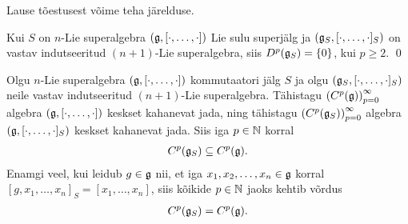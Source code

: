 Lause tõestusest võime teha järelduse.

\begin{jar}
    Kui $S$ on $n$-Lie superalgebra $(\mathfrak{g}, [\cdot, \dots, \cdot])$
    Lie sulu superjälg ja $(\mathfrak{g}_S, [\cdot, \dots, \cdot]_S)$ on
    vastav indutseeritud $(n+1)$-Lie superalgebra, siis
    $D^p(\mathfrak{g}_S) = \{0\}$, kui $p \geq 2$. \hfill \qed
\end{jar}

\begin{lau}
    Olgu $n$-Lie superalgebra $(\mathfrak{g}, [\cdot, \dots, \cdot])$
    kommutaatori jälg $S$ ja olgu $(\mathfrak{g}_S, [\cdot, \dots, \cdot]_S)$
    neile vastav indutseeritud $(n+1)$-Lie superalgebra.
    Tähistagu $\left(C^p(\mathfrak{g})\right)_{p=0}^\infty$ algebra
    $(\mathfrak{g}, [\cdot, \dots, \cdot])$
    keskset kahanevat jada, ning tähistagu
    $\left(C^p(\mathfrak{g}_S)\right)_{p=0}^\infty$ algebra
    $(\mathfrak{g}, [\cdot, \dots, \cdot]_S)$
    keskset kahanevat jada. Siis iga $p \in \mathbb{N}$ korral
    \begin{align*}
        C^p(\mathfrak{g}_S) \subseteq C^p(\mathfrak{g}).
    \end{align*}
    Enamgi veel, kui leidub $g \in \mathfrak{g}$ nii, et iga
    $x_1, x_2, \dots, x_n \in \mathfrak{g}$ korral
    $[g, x_1, \dots, x_n]_S = [x_1, \dots, x_n]$, siis
    kõikide $p \in \mathbb{N}$ jaoks kehtib võrdus
    \begin{align*}
        C^p(\mathfrak{g}_S) = C^p(\mathfrak{g}).
    \end{align*}
\end{lau}

